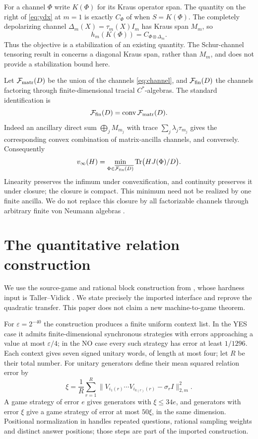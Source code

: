 \documentclass[11pt,a4paper]{article}
\newcommand{\Tr}{\operatorname{Tr}}
\newcommand{\norm}[1]{\lVert#1\rVert}
\newcommand{\FM}{\mathcal F}
\begin{document}
For a channel $\Phi$ write $K(\Phi)$ for its Kraus operator span. The quantity on the right of \eqref{eq:ydx} at $m=1$ is exactly $C_\Phi$ of \cite{ydx} when $S=K(\Phi)$. The completely depolarizing channel $\Delta_m(X)=\tau_m(X)I_m$ has Kraus span $M_m$, so
\[
 h_m(K(\Phi))=C_{\Phi\otimes\Delta_m}.
\]
Thus the objective is a stabilization of an existing quantity. The Schur-channel tensoring result in \cite[Theorem 2]{ydx} concerns a diagonal Kraus span, rather than $M_m$, and does not provide a stabilization bound here.

Let $\FM_{\rm matr}(D)$ be the union of the channels \eqref{eq:channel}, and $\FM_{\rm fin}(D)$ the channels factoring through finite-dimensional tracial $C^*$-algebras. The standard identification \cite[Proposition 3.8]{musat} is
\[
 \FM_{\rm fin}(D)=\operatorname{conv}\FM_{\rm matr}(D).
\]
Indeed an ancillary direct sum $\bigoplus_j M_{m_j}$ with trace
$\sum_j\lambda_j\tau_{m_j}$ gives the corresponding convex combination of matrix-ancilla channels, and conversely. Consequently
\begin{equation}
 v_\infty(H)=\min_{\Phi\in\overline{\FM_{\rm fin}(D)}}
                  \Tr\bigl(HJ(\Phi)/D\bigr).                   \label{eq:fm}
\end{equation}
Linearity preserves the infimum under convexification, and continuity preserves it under closure; the closure is compact. This minimum need not be realized by one finite ancilla. We do not replace this closure by all factorizable channels through arbitrary finite von Neumann algebras \cite{hm,mr}.

\section{The quantitative relation construction}
We use the source-game and rational block construction from \cite{compiler}, whose hardness input is Taller--Vidick \cite[Theorem 5.2]{tv}. We state precisely the imported interface and reprove the quadratic transfer. This paper does not claim a new machine-to-game theorem.

For $\varepsilon=2^{-40}$ the construction produces a finite uniform context list. In the YES case it admits finite-dimensional synchronous strategies with errors approaching a value at most $\varepsilon/4$; in the NO case every such strategy has error at least $1/1296$. Each context gives seven signed unitary words, of length at most four; let $R$ be their total number. For unitary generators define their mean squared relation error by
\[
 \xi=\frac1R\sum_{r=1}^R
       \norm{V_{i_1(r)}\cdots V_{i_{k(r)}(r)}-\sigma_r I}_{2,m}^2.
\]
A game strategy of error $e$ gives generators with $\xi\le34e$, and generators with error $\xi$ give a game strategy of error at most $50\xi$, in the same dimension. Positional normalization in \cite{compiler} handles repeated questions, rational sampling weights and distinct answer positions; those steps are part of the imported construction.
\end{document}
